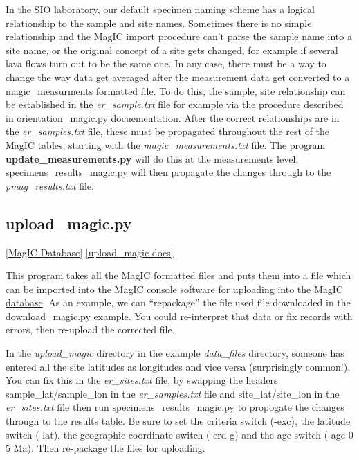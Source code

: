 \documentclass[11pt]{book}
\begin{document}
{In the SIO laboratory, our default specimen naming scheme has a logical relationship to the sample and site names.
Sometimes there is no simple relationship and the MagIC import procedure can't parse the sample name into a site name, or the original concept of a site gets changed, for example if several lava flows turn out to be the same one.  In any case, there must be a way to change the way data get averaged after the measurement data get converted to a magic\_measurments formatted file.  To do this, the sample, site relationship can be established in the {\it er\_sample.txt} file for example via the procedure described in \href{#orientation_magic.py}{orientation\_magic.py} docuementation.  After the correct relationships are in the {\it er\_samples.txt} file, these must be propagated throughout the rest of the MagIC tables, starting with the {\it magic\_measurements.txt} file.  The program {\bf update\_measurements.py} will do this at the measurements level.  \href{#specimens_results_magic.py}{specimens\_results\_magic.py} will then propagate the changes through to the {\it pmag\_results.txt} file.



\subsection{upload\_magic.py}
\href{#MagICDatabase}{[MagIC Database]}
\href{https://github.com/PmagPy/PmagPy/blob/master/programs/upload_magic.py}{[upload\_magic docs]}

This program takes all the MagIC formatted files and puts them into a file which can be imported into the MagIC console software for uploading into the \href{http://earthref.org/MagIC}{MagIC database}.
As an example, we can ``repackage'' the file used file downloaded in the \href{#download_magic.py}{download\_magic.py} example.  You could re-interpret that data or fix records with errors, then re-upload the corrected file.

In the {\it upload\_magic} directory in the example {\it data\_files} directory, someone has entered all the site latitudes as longitudes and vice versa (surprisingly common!).    You can fix this in the {\it er\_sites.txt} file, by swapping the headers sample\_lat/sample\_lon in the {\it er\_samples.txt} file and site\_lat/site\_lon in the {\it er\_sites.txt} file then run \href{#specimens\_results\_magic.py}{specimens\_results\_magic.py} to propogate the changes through to the results table.  Be sure to set the criteria switch (-exc), the latitude switch (-lat), the geographic coordinate switch (-crd g) and the age switch (-age 0 5 Ma).    Then re-package the files for uploading.

}
\end{document}

